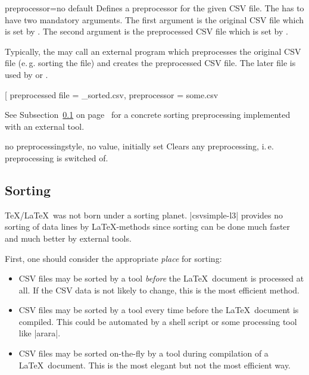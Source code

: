 \documentclass[a4paper,11pt]{ltxdoc}
\begin{document}
\begin{docCsvKey}{preprocessor}{=}{no default}
  Defines a preprocessor for the given CSV file.
  The  has to have two mandatory arguments. The first argument
  is the original CSV file which is set by .
  The second argument is the preprocessed CSV file
  which is set by .\par\smallskip
  Typically, the  may call an external program which preprocesses
  the original CSV file (e.\,g. sorting the file) and creates the
  preprocessed CSV file. The later file is used by 
  or .
\begin{dispListing}
\newcommand{\mySortTool}[2]{%
}

\csvreader[%
    preprocessed file = \jobname_sorted.csv,
    preprocessor      = \mySortTool,
  ]{some.csv}{}{%
}
\end{dispListing}
See Subsection~\ref{sec:Sorting} on page~\pageref{sec:Sorting} for a
concrete sorting preprocessing implemented with an external tool.
\end{docCsvKey}


\begin{docCsvKey}{no preprocessing}{}{style, no value, initially set}
  Clears any preprocessing, i.\,e. preprocessing is switched of.
\end{docCsvKey}



\clearpage
\subsection{Sorting}\label{sec:Sorting}%
\TeX/\LaTeX\ was not born under a sorting planet. |csvsimple-l3| provides no
sorting of data lines by \LaTeX-methods since sorting can be done much faster
and much better by external tools.

First, one should consider the appropriate \emph{place} for sorting:
\begin{itemize}
\item CSV files may be sorted by a tool \emph{before} the \LaTeX\ document is processed
  at all. If the CSV data is not likely to change, this is the most efficient method.
\item CSV files may be sorted by a tool every time before the \LaTeX\ document is compiled.
  This could be automated by a shell script or some processing tool like |arara|.
\item CSV files may be sorted on-the-fly by a tool during compilation of
  a \LaTeX\ document. This is the most elegant but not the most efficient way.
\end{itemize}
\end{document}
